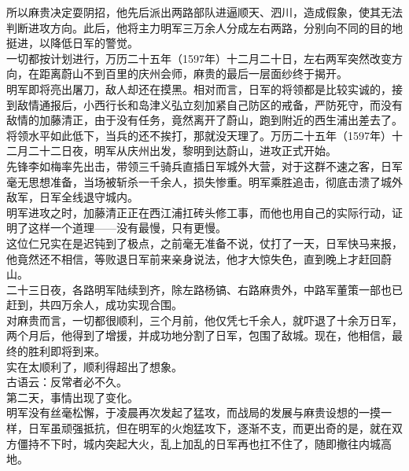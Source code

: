 \begin{multicols}{\theparacolNo}
所以麻贵决定耍阴招，他先后派出两路部队进逼顺天、泗川，造成假象，使其无法判断进攻方向。此后，他将主力明军三万余人分成左右两路，分别向不同的目的地挺进，以降低日军的警觉。\\

一切都按计划进行，万历二十五年（1597年）十二月二十日，左右两军突然改变方向，在距离蔚山不到百里的庆州会师，麻贵的最后一层面纱终于揭开。\\

明军即将亮出屠刀，敌人却还在摸黑。相对而言，日军的将领都是比较实诚的，接到敌情通报后，小西行长和岛津义弘立刻加紧自己防区的戒备，严防死守，而没有敌情的加藤清正，由于没有任务，竟然离开了蔚山，跑到附近的西生浦出差去了。\\

将领水平如此低下，当兵的还不挨打，那就没天理了。万历二十五年（1597年）十二月二十二日夜，明军从庆州出发，黎明到达蔚山，进攻正式开始。\\

先锋李如梅率先出击，带领三千骑兵直插日军城外大营，对于这群不速之客，日军毫无思想准备，当场被斩杀一千余人，损失惨重。明军乘胜追击，彻底击溃了城外敌军，日军全线退守城内。\\

明军进攻之时，加藤清正正在西江浦扛砖头修工事，而他也用自己的实际行动，证明了这样一个道理——没有最慢，只有更慢。\\

这位仁兄实在是迟钝到了极点，之前毫无准备不说，仗打了一天，日军快马来报，他竟然还不相信，等败退日军前来亲身说法，他才大惊失色，直到晚上才赶回蔚山。\\

二十三日夜，各路明军陆续到齐，除左路杨镐、右路麻贵外，中路军董策一部也已赶到，共四万余人，成功实现合围。\\

对麻贵而言，一切都很顺利，三个月前，他仅凭七千余人，就吓退了十余万日军，两个月后，他得到了增援，并成功地分割了日军，包围了敌城。现在，他相信，最终的胜利即将到来。\\

实在太顺利了，顺利得超出了想象。\\

古语云：反常者必不久。\\

第二天，事情出现了变化。\\

明军没有丝毫松懈，于凌晨再次发起了猛攻，而战局的发展与麻贵设想的一摸一样，日军虽顽强抵抗，但在明军的火炮猛攻下，逐渐不支，而更出奇的是，就在双方僵持不下时，城内突起大火，乱上加乱的日军再也扛不住了，随即撤往内城高地。\\


\end{multicols}
